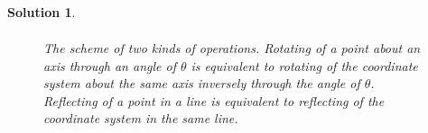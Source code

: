 \documentclass[UTF8,10pt,a4paper]{article}
\theoremstyle{Problem}
\theoremstyle{Solution}
\newtheorem*{sol}{Solution}
\begin{document}
\begin{sol}
\begin{align}
    \end{align}
    \begin{figure}[h]
        \centering
        \caption{The scheme of two kinds of operations. Rotating of a point about an axis through an angle of $\theta$ is equivalent to rotating of the coordinate system about the same axis inversely through the angle of $\theta$. Reflecting of a point in a line is equivalent to reflecting of the coordinate system in the same line.}
    \end{figure}
\end{sol}
\end{document}
